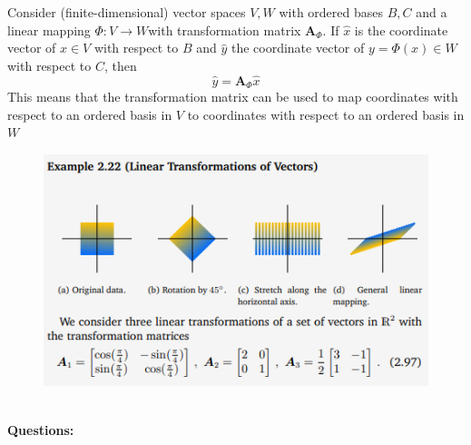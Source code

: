 Consider (finite-dimensional) vector spaces $V,W$ with ordered bases $B,C$ and a linear mapping $\Phi: V \longrightarrow W $with transformation matrix $\mathbf{A}_{\Phi}$. If $\hat{x}$ is the coordinate vector of $x \in V$ with respect to $B$ and $\hat{y}$ the coordinate vector of $y = \Phi(x) \in W$ with respect to $C$, then
\[
    \hat{y} = \mathbf{A}_{\Phi}\hat{x}    
\]
This means that the transformation matrix can be used to map coordinates with respect to an ordered basis in $V$ to coordinates with respect to an ordered basis in $W$
\begin{figure}[htbp]
    \centering
    \includegraphics[width=12cm]{Mathematical Background/example-transformation-matrix-application.png}
\end{figure}\\
\textbf{Questions:}\\
